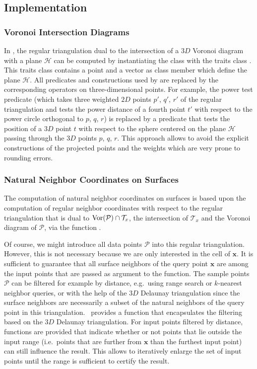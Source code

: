\subsection{Implementation}
\subsubsection{Voronoi Intersection Diagrams}

In \cgal, the regular triangulation dual to the intersection of a $3D$
Voronoi diagram with a plane $\mathcal{H}$ can be computed by
instantiating the  class with
the traits class . This traits
class contains a point and a vector as class member which define the
plane $\mathcal{H}$. All predicates and constructions used by
 are replaced by the
corresponding operators on three-dimensional points. For example, the
power test predicate (which takes three weighted $2D$ points
$p'$, $q'$, $r'$ of the regular triangulation and tests the power
distance of a fourth point $t'$ with respect to the power circle orthogonal
to $p$, $q$, $r$) is replaced by a
 predicate that tests the
position of a $3D$ point $t$ with respect to the sphere centered on
the plane $\mathcal{H}$ passing through the $3D$ points $p$, $q$, $r$.
This approach allows to avoid the explicit constructions of the
projected points and the weights which are very prone to rounding
errors.

\subsubsection{Natural Neighbor Coordinates on Surfaces}

The computation of natural neighbor coordinates on surfaces is based
upon the computation of regular neighbor coordinates with respect to
the regular triangulation that is dual to ${\rm Vor}(\mathcal{P}) \cap
\mathcal{T}_x$, the intersection of $\mathcal{T}_x$ and the Voronoi
diagram of $\mathcal{P}$, via the function
.

Of course, we might introduce all data points $\mathcal{P}$ into this
regular triangulation. However, this is not necessary because we are
only interested in the cell of $\mathbf{x}$. It is sufficient to
guarantee that all surface neighbors of the query point $\mathbf{x}$
are among the input points that are passed as argument to the
function. The sample points $\mathcal{P}$ can be filtered for example
by distance, e.g.\ using range search or $k$-nearest neighbor queries,
or with the help of the $3D$ Delaunay triangulation since the surface
neighbors are necessarily a subset of the natural neighbors of the
query point in this triangulation. \cgal\ provides a function that
encapsulates the filtering based on the $3D$ Delaunay triangulation.
For input points filtered by distance, functions are provided that
indicate whether or not points that lie outside the input range (i.e.\ 
points that are further from $\mathbf{x}$ than the furthest input
point) can still influence the result.  This allows to iteratively
enlarge the set of input points until the range is sufficient to
certify the result.

